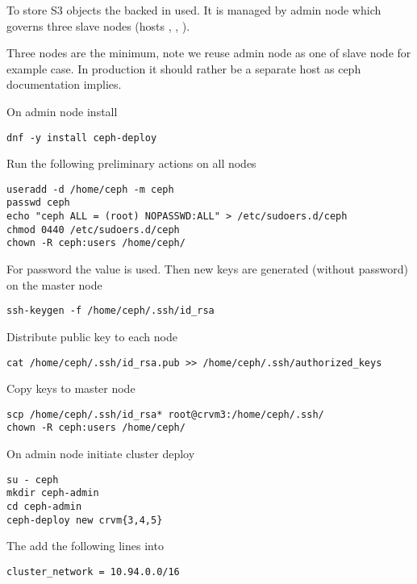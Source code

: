 To store S3 objects the  backed in used.
It is managed by  admin node which governs three slave nodes
(hosts , , ).

Three nodes are the minimum, note we reuse admin node as one of slave node
for example case. In production it should rather be a separate host as
ceph documentation implies.

On admin node install

\begin{lstlisting}
dnf -y install ceph-deploy
\end{lstlisting}

Run the following preliminary actions on all nodes

\begin{lstlisting}
useradd -d /home/ceph -m ceph
passwd ceph
echo "ceph ALL = (root) NOPASSWD:ALL" > /etc/sudoers.d/ceph
chmod 0440 /etc/sudoers.d/ceph
chown -R ceph:users /home/ceph/
\end{lstlisting}

For password the value  is used. Then
new keys are generated (without password) on the master node

\begin{lstlisting}
ssh-keygen -f /home/ceph/.ssh/id_rsa
\end{lstlisting}

Distribute public key to each node

\begin{lstlisting}
cat /home/ceph/.ssh/id_rsa.pub >> /home/ceph/.ssh/authorized_keys
\end{lstlisting}

Copy keys to master node

\begin{lstlisting}
scp /home/ceph/.ssh/id_rsa* root@crvm3:/home/ceph/.ssh/
chown -R ceph:users /home/ceph/
\end{lstlisting}

On admin node initiate cluster deploy

\begin{lstlisting}
su - ceph
mkdir ceph-admin
cd ceph-admin
ceph-deploy new crvm{3,4,5}
\end{lstlisting}

The add the following lines into 

\begin{lstlisting}
cluster_network = 10.94.0.0/16
\end{lstlisting}

